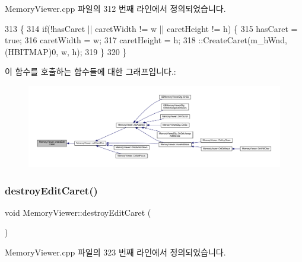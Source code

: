 Memory\+Viewer.\+cpp 파일의 312 번째 라인에서 정의되었습니다.


\begin{DoxyCode}
313 \{
314   \textcolor{keywordflow}{if}(!hasCaret || caretWidth != w || caretHeight != h) \{
315     hasCaret = \textcolor{keyword}{true};
316     caretWidth = w;
317     caretHeight = h;
318     ::CreateCaret(m\_hWnd, (HBITMAP)0, w, h);
319   \}
320 \}
\end{DoxyCode}
이 함수를 호출하는 함수들에 대한 그래프입니다.\+:
\nopagebreak
\begin{figure}[H]
\begin{center}
\leavevmode
\includegraphics[width=350pt]{class_memory_viewer_a73ddaf427846eedb7073ad6fc69001ac_icgraph}
\end{center}
\end{figure}
\mbox{\label{class_memory_viewer_ab658d89232d31d190ac4e323d61c4b8f}} 
\subsubsection{\texorpdfstring{destroy\+Edit\+Caret()}{destroyEditCaret()}}
{\footnotesize\ttfamily void Memory\+Viewer\+::destroy\+Edit\+Caret (\begin{DoxyParamCaption}{ }\end{DoxyParamCaption})}



Memory\+Viewer.\+cpp 파일의 323 번째 라인에서 정의되었습니다.


